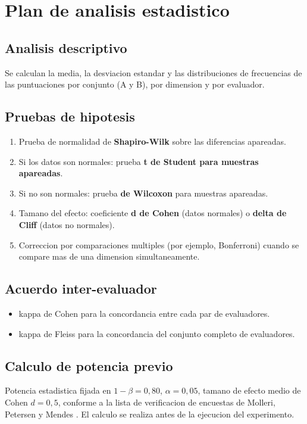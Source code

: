 \documentclass[12pt,a4paper]{article}
\begin{document}
\section{Plan de analisis estadistico}

\subsection{Analisis descriptivo}
Se calculan la media, la desviacion estandar y las distribuciones de
frecuencias de las puntuaciones por conjunto (A y B), por dimension y por
evaluador.

\subsection{Pruebas de hipotesis}
\begin{enumerate}
    \item Prueba de normalidad de \textbf{Shapiro-Wilk} sobre las diferencias
    apareadas.
    \item Si los datos son normales: prueba \textbf{t de Student para muestras
    apareadas}.
    \item Si no son normales: prueba \textbf{de Wilcoxon} para muestras
    apareadas.
    \item Tamano del efecto: coeficiente \textbf{d de Cohen} (datos normales)
    o \textbf{delta de Cliff} (datos no normales).
    \item Correccion por comparaciones multiples (por ejemplo, Bonferroni)
    cuando se compare mas de una dimension simultaneamente.
\end{enumerate}

\subsection{Acuerdo inter-evaluador}
\begin{itemize}
    \item kappa de Cohen \cite{cohen1960} para la concordancia entre cada par
    de evaluadores.
    \item kappa de Fleiss \cite{fleiss1971} para la concordancia del conjunto
    completo de evaluadores.
\end{itemize}

\subsection{Calculo de potencia previo}
Potencia estadistica fijada en \(1-\beta = 0{,}80\), \(\alpha = 0{,}05\), tamano
de efecto medio de Cohen \(d = 0{,}5\), conforme a la lista de verificacion de
encuestas de Molleri, Petersen y Mendes \cite{molleri2020}. El calculo se
realiza antes de la ejecucion del experimento.
\end{document}
